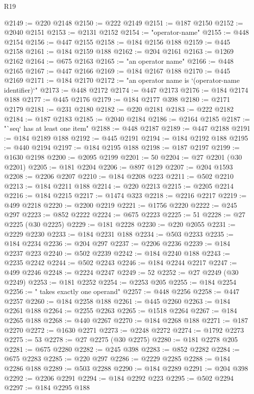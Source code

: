 \begin{lexlean}{R19}
\begin{coremodule}
@2149 := @220 @2148
@2150 := @222 @2149
@2151 := @187 @2150
@2152 := @2040 @2151
@2153 := @2131 @2152
@2154 := "operator-name"
@2155 := @448 @2154
@2156 := @447 @2155
@2158 := @184 @2156 @188
@2159 := @445 @2158
@2161 := @184 @2159 @188
@2162 := @204 @2161
@2163 := @1269 @2162
@2164 := @675 @2163
@2165 := "an operator name"
@2166 := @448 @2165
@2167 := @447 @2166
@2169 := @184 @2167 @188
@2170 := @445 @2169
@2171 := @184 @2170
@2172 := "an operator name is `(operator-name identifier)`"
@2173 := @448 @2172
@2174 := @447 @2173
@2176 := @184 @2174 @188
@2177 := @445 @2176
@2179 := @184 @2177 @398
@2180 := @2171 @2179
@2181 := @231 @2180
@2182 := @220 @2181
@2183 := @222 @2182
@2184 := @187 @2183
@2185 := @2040 @2184
@2186 := @2164 @2185
@2187 := "`seq` has at least one item"
@2188 := @448 @2187
@2189 := @447 @2188
@2191 := @184 @2189 @188
@2192 := @445 @2191
@2194 := @184 @2192 @188
@2195 := @440 @2194
@2197 := @184 @2195 @188
@2198 := @187 @2197
@2199 := @1630 @2198
@2200 := @2095 @2199
@2201 := 50
@2204 := @27 @2201 (@30 @2201)
@2205 := @181 @2204
@2206 := @897 @129
@2207 := @204 @1593
@2208 := @2206 @2207
@2210 := @184 @2208 @223
@2211 := @502 @2210
@2213 := @184 @2211 @188
@2214 := @220 @2213
@2215 := @2205 @2214
@2216 := @184 @2215
@2217 := @1474 @323
@2218 := @2216 @2217
@2219 := @499 @2218
@2220 := @2200 @2219
@2221 := @1756 @2220
@2222 := @245 @297
@2223 := @852 @2222
@2224 := @675 @2223
@2225 := 51
@2228 := @27 @2225 (@30 @2225)
@2229 := @181 @2228
@2230 := @220 @2055
@2231 := @2229 @2230
@2233 := @184 @2231 @188
@2234 := @503 @2233
@2235 := @184 @2234
@2236 := @204 @297
@2237 := @2206 @2236
@2239 := @184 @2237 @223
@2240 := @502 @2239
@2242 := @184 @2240 @188
@2243 := @2235 @2242
@2244 := @502 @2243
@2246 := @184 @2244 @2217
@2247 := @499 @2246
@2248 := @2224 @2247
@2249 := 52
@2252 := @27 @2249 (@30 @2249)
@2253 := @181 @2252
@2254 := @2253 @205
@2255 := @184 @2254
@2256 := " takes exactly one operand"
@2257 := @448 @2256
@2258 := @447 @2257
@2260 := @184 @2258 @188
@2261 := @445 @2260
@2263 := @184 @2261 @188
@2264 := @2255 @2263
@2265 := @1518 @2264
@2267 := @184 @2265 @188
@2268 := @440 @2267
@2270 := @184 @2268 @188
@2271 := @187 @2270
@2272 := @1630 @2271
@2273 := @2248 @2272
@2274 := @1792 @2273
@2275 := 53
@2278 := @27 @2275 (@30 @2275)
@2280 := @181 @2278 @205
@2281 := @675 @2280
@2282 := @245 @398
@2283 := @852 @2282
@2284 := @675 @2283
@2285 := @220 @297
@2286 := @2229 @2285
@2288 := @184 @2286 @188
@2289 := @503 @2288
@2290 := @184 @2289
@2291 := @204 @398
@2292 := @2206 @2291
@2294 := @184 @2292 @223
@2295 := @502 @2294
@2297 := @184 @2295 @188

\end{coremodule}
\end{lexlean}
